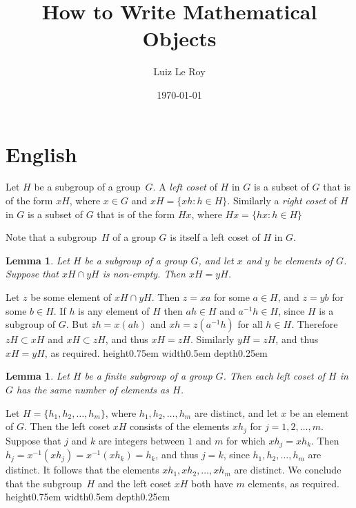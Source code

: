 \documentclass[a4paper]{article}
\title{How to Write Mathematical Objects}
\author{Luiz Le Roy}
\date{\today}
\newtheorem{lemma}[theorem]{Lemma}
\newenvironment{proof}[1][Proof]{\begin{trivlist}
\item[\hskip \labelsep {\bfseries #1}]}{\end{trivlist}}
\newenvironment{definition}[1][Definition]{\begin{trivlist}
\item[\hskip \labelsep {\bfseries #1}]}{\end{trivlist}}
\newcommand{\qed}{\nobreak \ifvmode \relax \else
      \ifdim\lastskip<1.5em \hskip-\lastskip
      \hskip1.5em plus0em minus0.5em \fi \nobreak
      \vrule height0.75em width0.5em depth0.25em\fi}
\begin{document}
\maketitle

\begin{abstract}

\end{abstract}

\section{English}
\begin{definition}
Let $H$ be a subgroup of a group~$G$.  A \emph{left coset} of $H$ in $G$ is a subset of $G$ that is of the form $xH$, where $x \in G$ and $xH = \{ xh : h \in H \}$. Similarly a \emph{right coset} of $H$ in $G$ is a subset of $G$ that is of the form $Hx$, where $Hx = \{ hx : h \in H \}$
\end{definition}

Note that a subgroup~$H$ of a group $G$ is itself a left coset of $H$ in $G$.

\begin{lemma}
\label{LeftCosetsDisjoint}
Let $H$ be a subgroup of a group $G$, and let $x$ and $y$ be elements of $G$.  Suppose that $xH \cap yH$ is non-empty. Then $xH = yH$.
\end{lemma}

\begin{proof}
Let $z$ be some element of $xH \cap yH$.  Then $z = xa$ for some $a \in H$, and $z = yb$ for some $b \in H$. If $h$ is any element of $H$ then $ah \in H$ and $a^{-1}h \in H$, since $H$ is a subgroup of $G$. But $zh = x(ah)$ and $xh = z(a^{-1}h)$ for all $h \in H$. Therefore $zH \subset xH$ and $xH \subset zH$, and thus $xH = zH$.  Similarly $yH = zH$, and thus $xH = yH$, as required.\qed
\end{proof}

\begin{lemma}
\label{SizeOfLeftCoset}
Let $H$ be a finite subgroup of a group $G$.  Then each left coset of $H$ in $G$ has the same number of elements as $H$.
\end{lemma}

\begin{proof}
Let $H = \{ h_1, h_2,\ldots, h_m\}$, where $h_1, h_2,\ldots, h_m$ are distinct, and let $x$ be an element of $G$.  Then the left coset $xH$ consists of the elements $x h_j$ for $j = 1,2,\ldots,m$. Suppose that $j$ and $k$ are integers between $1$ and $m$ for which $x h_j = x h_k$.  Then $h_j = x^{-1} (x h_j) = x^{-1} (x h_k) = h_k$, and thus $j = k$, since $h_1, h_2,\ldots, h_m$ are distinct.  It follows that the elements $x h_1, x h_2,\ldots, x h_m$ are distinct. We conclude that the subgroup~$H$ and the left coset $xH$ both have $m$ elements, as required.\qed
\end{proof}
\end{document}
